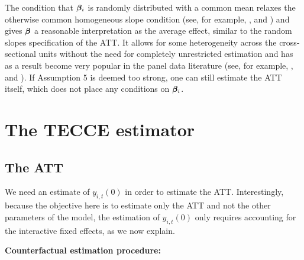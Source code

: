 \documentclass[12pt,fleqn]{article}
\begin{document}
  The condition that $\boldsymbol{\beta}_i$ is randomly distributed with a common mean relaxes the otherwise common homogeneous slope condition (see, for example, \citealp{Gobillon_Magnac_2016}, and \citealp{Xu_2017}) and gives $\boldsymbol{\beta}$ a reasonable interpretation as the average effect, similar to the random slopes specification of the ATT. It allows for some heterogeneity across the cross-sectional units without the need for completely unrestricted estimation and has as a result become very popular in the panel data literature (see, for example, \citealp{chudik2011weak}, and \citealp{pesaran2006estimation}). If Assumption 5 is deemed too strong, one can still estimate the ATT itself, which does not place any conditions on $\boldsymbol{\beta}_i$.
  
  \section{The TECCE estimator}
  
  \subsection{The ATT}
  
  We need an estimate of $y_{i,t}(0)$ in order to estimate the ATT. Interestingly, because the objective here is to estimate only the ATT and not the other parameters of the model, the estimation of $y_{i,t}(0)$ only requires accounting for the interactive fixed effects, as we now explain.
  
  \bigskip
  
  \noindent \textbf{Counterfactual estimation procedure:}
  
\end{document}

